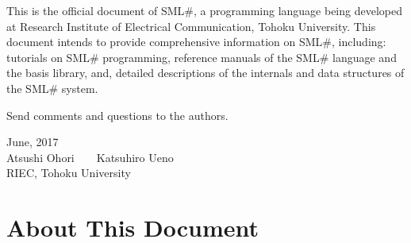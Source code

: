 \documentclass{jbook}
\newcommand{\txt}[2]{#2}
\newcommand{\authors}
{\txt{大堀\ \ 淳\mbox{\ \ \ \ }上野 雄大
\\
東北大学 電気通信研究所
}
{Atsushi Ohori\mbox{\ \ \ \ }Katsuhiro Ueno
\\
RIEC, Tohoku University
}
}
\newcommand{\smlsharp}{SML\#}
\begin{document}
\else%
	This is the official document of \smlsharp{}, a programming
language being developed at Research Institute of Electrical
Communication, Tohoku University.
	This document intends to provide comprehensive information on
\smlsharp{}, including:
tutorials on \smlsharp{} programming, 
reference manuals of the \smlsharp{} language and the basis library,
and,
detailed descriptions of the internals and data structures of the
\smlsharp{} system.

	Send comments and questions to the authors.
\fi%

\begin{flushright}
\txt{
2017年6月\\
\authors
}
{
June, 2017\\
\authors
}
\end{flushright}

\chapter{\txt{本書の構成と執筆状況}{About This Document}}
\end{document}
